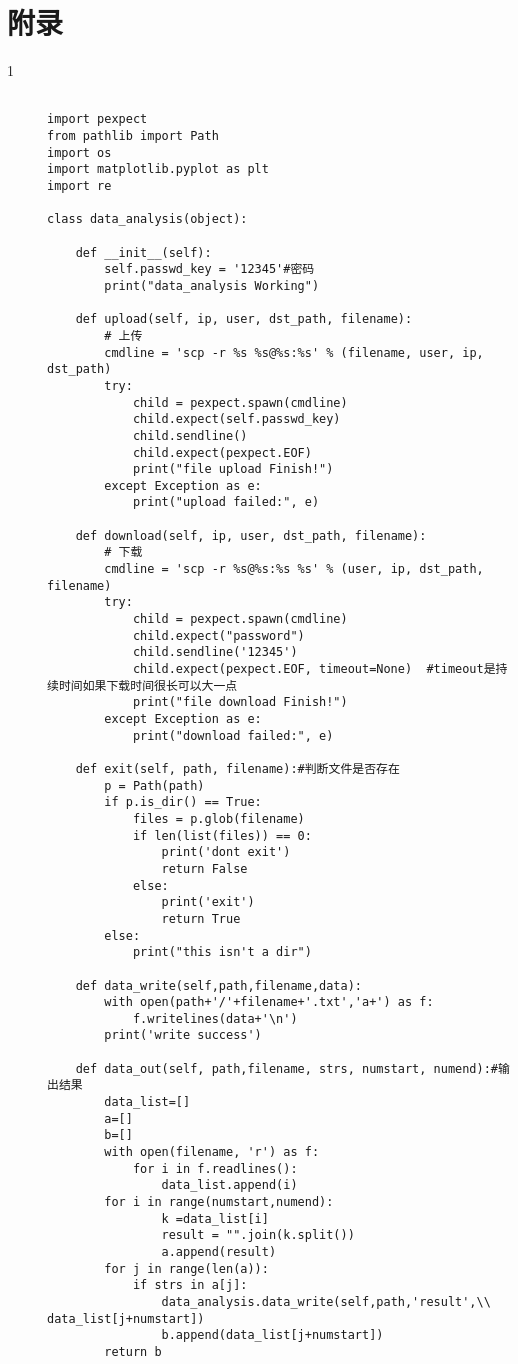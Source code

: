 \section*{附录}

\begin{description}
	\item[1] 
	\begin{lstlisting}
		
import pexpect
from pathlib import Path
import os
import matplotlib.pyplot as plt
import re

class data_analysis(object):

    def __init__(self):
        self.passwd_key = '12345'#密码
        print("data_analysis Working")

    def upload(self, ip, user, dst_path, filename):
        # 上传
        cmdline = 'scp -r %s %s@%s:%s' % (filename, user, ip, dst_path)
        try:
            child = pexpect.spawn(cmdline)
            child.expect(self.passwd_key)
            child.sendline()
            child.expect(pexpect.EOF)
            print("file upload Finish!")
        except Exception as e:
            print("upload failed:", e)

    def download(self, ip, user, dst_path, filename):
        # 下载
        cmdline = 'scp -r %s@%s:%s %s' % (user, ip, dst_path, filename)
        try:
            child = pexpect.spawn(cmdline)
            child.expect("password")
            child.sendline('12345')
            child.expect(pexpect.EOF, timeout=None)  #timeout是持续时间如果下载时间很长可以大一点
            print("file download Finish!")
        except Exception as e:
            print("download failed:", e)

    def exit(self, path, filename):#判断文件是否存在
        p = Path(path)
        if p.is_dir() == True:
            files = p.glob(filename)
            if len(list(files)) == 0:
                print('dont exit')
                return False
            else:
                print('exit')
                return True
        else:
            print("this isn't a dir")

    def data_write(self,path,filename,data):
        with open(path+'/'+filename+'.txt','a+') as f:
            f.writelines(data+'\n')
        print('write success')

    def data_out(self, path,filename, strs, numstart, numend):#输出结果
        data_list=[]
        a=[]
        b=[]
        with open(filename, 'r') as f:
            for i in f.readlines():
                data_list.append(i)
        for i in range(numstart,numend):
                k =data_list[i]
                result = "".join(k.split())
                a.append(result)
        for j in range(len(a)):
            if strs in a[j]:
                data_analysis.data_write(self,path,'result',\\ data_list[j+numstart])
                b.append(data_list[j+numstart])
        return b


\end{lstlisting}
\end{description}
